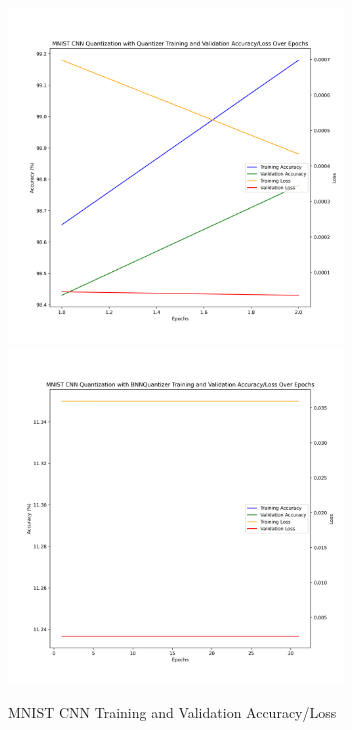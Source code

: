 \documentclass{article}
\begin{document}
\begin{figure}
    \centerline{\includegraphics[width=3.5in]{../proj2/figures/mnist_cnn_QAT_Quantizer.png}\includegraphics[width=3.5in]{../proj2/figures/mnist_cnn_BNNQuantizer.png}}
    \caption{MNIST CNN Training and Validation Accuracy/Loss}
    \label{fig:mnist-charts}
\end{figure}
\end{document}
